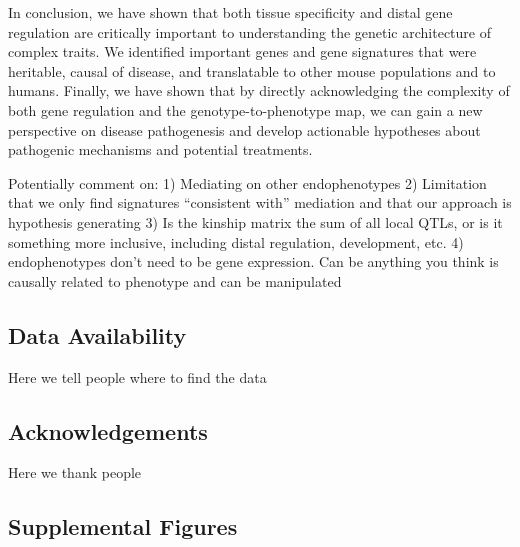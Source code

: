 \documentclass[
]{article}
\begin{document}
In conclusion, we have shown that both tissue specificity and distal
gene regulation are critically important to understanding the genetic
architecture of complex traits. We identified important genes and gene
signatures that were heritable, causal of disease, and translatable to
other mouse populations and to humans. Finally, we have shown that by
directly acknowledging the complexity of both gene regulation and the
genotype-to-phenotype map, we can gain a new perspective on disease
pathogenesis and develop actionable hypotheses about pathogenic
mechanisms and potential treatments.

Potentially comment on: 1) Mediating on other endophenotypes 2)
Limitation that we only find signatures ``consistent with'' mediation
and that our approach is hypothesis generating 3) Is the kinship matrix
the sum of all local QTLs, or is it something more inclusive, including
distal regulation, development, etc. 4) endophenotypes don't need to be
gene expression. Can be anything you think is causally related to
phenotype and can be manipulated

\subsection{Data Availability}\label{data-availability}

Here we tell people where to find the data

\subsection{Acknowledgements}\label{acknowledgements}

Here we thank people

\pagebreak

\subsection{Supplemental Figures}\label{supplemental-figures}
\end{document}
